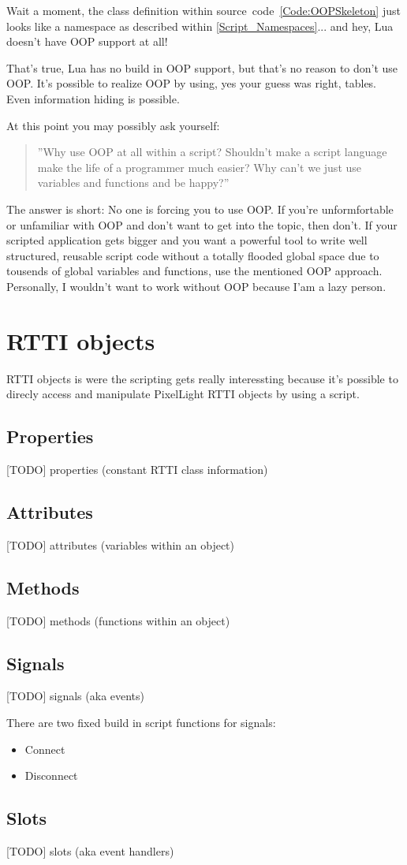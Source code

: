 Wait a moment, the class definition within source~code~\ref{Code:OOPSkeleton} just looks like a namespace as described within \ref{Script_Namespaces}... and hey, Lua doesn't have OOP support at all!

That's true, Lua has no build in OOP support, but that's no reason to don't use OOP. It's possible to realize OOP by using, yes your guess was right, tables. Even information hiding is possible.

At this point you may possibly ask yourself: \begin{quote}''Why use OOP at all within a script? Shouldn't make a script language make the life of a programmer much easier? Why can't we just use variables and functions and be happy?''\end{quote} The answer is short: No one is forcing you to use OOP. If you're unformfortable or unfamiliar with OOP and don't want to get into the topic, then don't. If your scripted application gets bigger and you want a powerful tool to write well structured, reusable script code without a totally flooded global space due to tousends of global variables and functions, use the mentioned OOP approach. Personally, I wouldn't want to work without OOP because I'am a lazy person.




\section{RTTI objects}
\label{Script_RTTIObjects}
RTTI objects is were the scripting gets really interessting because it's possible to direcly access and manipulate PixelLight RTTI objects by using a script.


\subsection{Properties}
[TODO]
properties (constant RTTI class information)


\subsection{Attributes}
[TODO]
attributes (variables within an object)


\subsection{Methods}
[TODO]
methods (functions within an object)


\subsection{Signals}
[TODO]
signals (aka events)

There are two fixed build in script functions for signals:
\begin{itemize}
\item{Connect}
\item{Disconnect}
\end{itemize}




\subsection{Slots}
[TODO]
slots (aka event handlers)